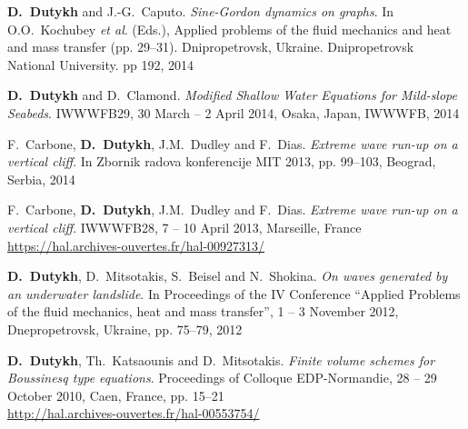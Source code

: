 \documentclass[final, a4paper, oneside, 12pt]{article}
\numberwithin{equation}{section}
\begin{document}
\begin{etaremune}
  \item \textbf{D.~Dutykh} and J.-G.~Caputo. \textit{Sine-Gordon dynamics on graphs}. In O.O.~Kochubey \emph{et al}. (Eds.), Applied problems of the fluid mechanics and heat and mass transfer (pp. 29--31). Dnipropetrovsk, Ukraine. Dnipropetrovsk National University. pp 192, 2014 %
  
  \item \textbf{D.~Dutykh} and D.~Clamond. \textit{Modified Shallow Water Equations for Mild-slope Seabeds}. IWWWFB29, 30 March -- 2 April 2014, Osaka, Japan, IWWWFB, 2014 %
  
  \item F.~Carbone, \textbf{D.~Dutykh}, J.M.~Dudley and F.~Dias. \textit{Extreme wave run-up on a vertical cliff}. In Zbornik radova konferencije MIT 2013, pp. 99--103, Beograd, Serbia, 2014 %
  

  
  \item F.~Carbone, \textbf{D.~Dutykh}, J.M.~Dudley and F.~Dias. \textit{Extreme wave run-up on a vertical cliff}. IWWWFB28, 7 -- 10 April 2013, Marseille, France \\ %
  \url{https://hal.archives-ouvertes.fr/hal-00927313/}
  

  
  \item \textbf{D.~Dutykh}, D.~Mitsotakis, S.~Beisel and N.~Shokina. \textit{On waves generated by an underwater landslide}. In Proceedings of the IV Conference ``Applied Problems of the fluid mechanics, heat and mass transfer'', 1 -- 3 November 2012, Dnepropetrovsk, Ukraine, pp. 75--79, 2012 %
  

  
  \item \textbf{D.~Dutykh}, Th.~Katsaounis and D.~Mitsotakis. \textit{Finite volume schemes for Boussinesq type equations}. Proceedings of Colloque EDP-Normandie, 28 -- 29 October 2010, Caen, France, pp. 15--21 \\ %
  \url{http://hal.archives-ouvertes.fr/hal-00553754/}


\end{etaremune}
\end{document}
